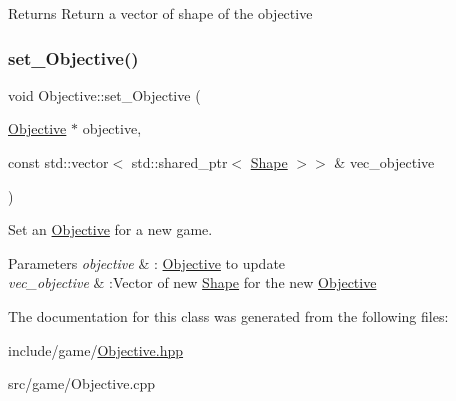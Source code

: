 \begin{DoxyReturn}{Returns}
Return a vector of shape of the objective 
\end{DoxyReturn}
\mbox{\label{classObjective_af6afb1e7baaaacc73a4c3554f3043407}} 
\subsubsection{\texorpdfstring{set\+\_\+\+Objective()}{set\_Objective()}}
{\footnotesize\ttfamily void Objective\+::set\+\_\+\+Objective (\begin{DoxyParamCaption}\item[{\hyperlink{classObjective}{Objective} $\ast$}]{objective,  }\item[{const std\+::vector$<$ std\+::shared\+\_\+ptr$<$ \hyperlink{classShape}{Shape} $>$$>$ \&}]{vec\+\_\+objective }\end{DoxyParamCaption})\hspace{0.3cm}{\ttfamily [static]}}



Set an \hyperlink{classObjective}{Objective} for a new game. 


\begin{DoxyParams}{Parameters}
{\em objective} & \+: \hyperlink{classObjective}{Objective} to update \\
\hline
{\em vec\+\_\+objective} & \+:Vector of new \hyperlink{classShape}{Shape} for the new \hyperlink{classObjective}{Objective} \\
\hline
\end{DoxyParams}


The documentation for this class was generated from the following files\+:\begin{DoxyCompactItemize}
\item 
include/game/\hyperlink{Objective_8hpp}{Objective.\+hpp}\item 
src/game/Objective.\+cpp\end{DoxyCompactItemize}
